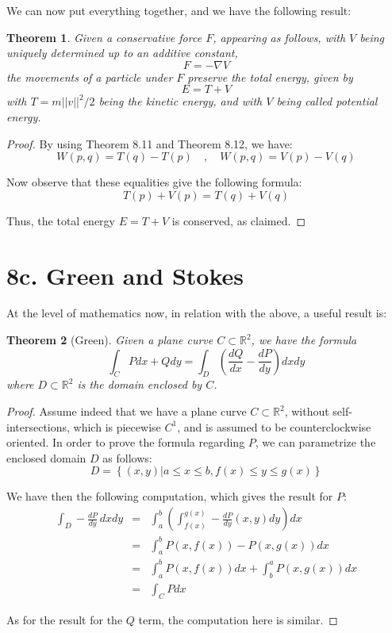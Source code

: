 \documentclass[12pt]{amsbook}
\newtheorem{theorem}{Theorem}[chapter]
\begin{document}
We can now put everything together, and we have the following result:


\begin{theorem}
Given a conservative force $F$, appearing as follows, with $V$ being uniquely determined up to an additive constant,
$$F=-\nabla V$$
the movements of a particle under $F$ preserve the total energy, given by
$$E=T+V$$
with $T=m||v||^2/2$ being the kinetic energy, and with $V$ being called potential energy.
\end{theorem}

\begin{proof}
By using Theorem 8.11 and Theorem 8.12, we have:
$$W(p,q)=T(q)-T(p)\quad,\quad 
W(p,q)=V(p)-V(q)$$

Now observe that these equalities give the following formula:
$$T(p)+V(p)=T(q)+V(q)$$

Thus, the total energy $E=T+V$ is conserved, as claimed.
\end{proof}

\section*{8c. Green and Stokes} 

At the level of mathematics now, in relation with the above, a useful result is:

\begin{theorem}[Green]
Given a plane curve $C\subset\mathbb R^2$, we have the formula
$$\int_CPdx+Qdy=\int_D\left(\frac{dQ}{dx}-\frac{dP}{dy}\right)dxdy$$
where $D\subset\mathbb R^2$ is the domain enclosed by $C$.
\end{theorem}

\begin{proof}
Assume indeed that we have a plane curve $C\subset\mathbb R^2$, without self-intersections, which is piecewise $C^1$, and is assumed to be counterclockwise oriented. In order to prove the formula regarding $P$, we can parametrize the enclosed domain $D$ as follows:
$$D=\left\{(x,y)\Big|a\leq x\leq b,f(x)\leq y\leq g(x)\right\}$$

We have then the following computation, which gives the result for $P$:
\begin{eqnarray*}
\int_D-\frac{dP}{dy}\,dxdy
&=&\int_a^b\left(\int_{f(x)}^{g(x)}-\frac{dP}{dy}(x,y)dy\right)dx\\
&=&\int_a^bP(x,f(x))-P(x,g(x))dx\\
&=&\int_a^bP(x,f(x))dx+\int_b^aP(x,g(x))dx\\
&=&\int_CPdx
\end{eqnarray*}

As for the result for the $Q$ term, the computation here is similar.
\end{proof}
\end{document}
